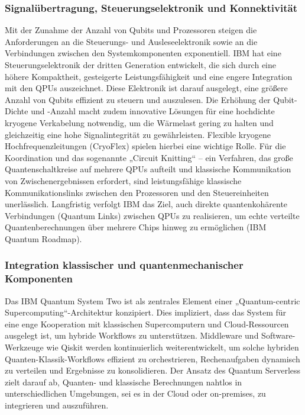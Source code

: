 \subsubsection{Signalübertragung, Steuerungselektronik und Konnektivität}
Mit der Zunahme der Anzahl von Qubits und Prozessoren steigen die Anforderungen an die Steuerungs- und Ausleseelektronik sowie an die Verbindungen zwischen den Systemkomponenten exponentiell. %
IBM hat eine Steuerungselektronik der dritten Generation entwickelt, die sich durch eine höhere Kompaktheit, gesteigerte Leistungsfähigkeit und eine engere Integration mit den QPUs auszeichnet. Diese Elektronik ist darauf ausgelegt, eine größere Anzahl von Qubits effizient zu steuern und auszulesen. %
Die Erhöhung der Qubit-Dichte und -Anzahl macht zudem innovative Lösungen für eine hochdichte kryogene Verkabelung notwendig, um die Wärmelast gering zu halten und gleichzeitig eine hohe Signalintegrität zu gewährleisten. Flexible kryogene Hochfrequenzleitungen (CryoFlex) spielen hierbei eine wichtige Rolle. Für die Koordination und das sogenannte „Circuit Knitting“ – ein Verfahren, das große Quantenschaltkreise auf mehrere QPUs aufteilt und klassische Kommunikation von Zwischenergebnissen erfordert, sind leistungsfähige klassische Kommunikationslinks zwischen den Prozessoren und den Steuereinheiten unerlässlich. %
Langfristig verfolgt IBM das Ziel, auch direkte quantenkohärente Verbindungen (Quantum Links) zwischen QPUs zu realisieren, um echte verteilte Quantenberechnungen über mehrere Chips hinweg zu ermöglichen (IBM Quantum Roadmap).

\subsubsection{Integration klassischer und quantenmechanischer Komponenten}
Das IBM Quantum System Two ist als zentrales Element einer „Quantum-centric Supercomputing“-Architektur konzipiert. Dies impliziert, dass das System für eine enge Kooperation mit klassischen Supercomputern und Cloud-Ressourcen ausgelegt ist, um hybride Workflows zu unterstützen. Middleware und Software-Werkzeuge wie Qiskit werden kontinuierlich weiterentwickelt, um solche hybriden Quanten-Klassik-Workflows effizient zu orchestrieren, Rechenaufgaben dynamisch zu verteilen und Ergebnisse zu konsolidieren. %
Der Ansatz des Quantum Serverless zielt darauf ab, Quanten- und klassische Berechnungen nahtlos in unterschiedlichen Umgebungen, sei es in der Cloud oder on-premises, zu integrieren und auszuführen.

